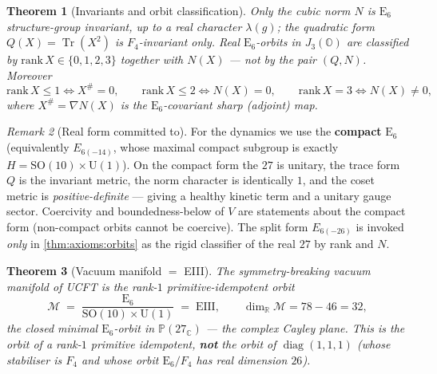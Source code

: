 \documentclass[11pt]{article}
\theoremstyle{plain}
\newtheorem{theorem}{Theorem}[section]
\theoremstyle{definition}
\theoremstyle{remark}
\newtheorem{remark}[theorem]{Remark}
\newcommand{\SO}[1]{\mathrm{SO}(#1)}
\newcommand{\U}[1]{\mathrm{U}(#1)}
\newcommand{\E}[1]{\mathrm{E}_{#1}}
\newcommand{\diag}{\operatorname{diag}}
\newcommand{\Tr}{\operatorname{Tr}}
\newcommand{\M}{\mathcal{M}}
\newcommand{\jalg}{J_3(\mathbb{O})}
\newcommand{\SOTen}{\SO{10}}
\newcommand{\UOne}{\U{1}}
\newcommand{\ESix}{\E{6}}
\begin{document}
\begin{theorem}[Invariants and orbit classification]\label{thm:axioms:orbits}
Only the cubic norm $N$ is $\ESix$ structure-group invariant, up to a real
character $\lambda(g)$; the quadratic form $Q(X)=\Tr(X^2)$ is
$F_4$-invariant only. Real $\ESix$-orbits in $\jalg$ are classified by
$\mathrm{rank}\,X\in\{0,1,2,3\}$ together with $N(X)$ ---
\emph{not} by the pair $(Q,N)$. Moreover
\[
  \mathrm{rank}\,X\le1\iff X^{\#}=0,\qquad
  \mathrm{rank}\,X\le2\iff N(X)=0,\qquad
  \mathrm{rank}\,X=3\iff N(X)\neq0,
\]
where $X^{\#}=\nabla N(X)$ is the $\ESix$-covariant sharp (adjoint) map.
\end{theorem}

\begin{remark}[Real form committed to]\label{rem:axioms:compact}
For the dynamics we use the \textbf{compact} $\ESix$ (equivalently
$E_{6(-14)}$, whose maximal compact subgroup is exactly
$H=\SOTen\times\UOne$). On the compact form the $27$ is unitary, the trace
form $Q$ is the invariant metric, the norm character is identically $1$, and
the coset metric is \emph{positive-definite} --- giving a healthy kinetic
term and a unitary gauge sector. Coercivity and boundedness-below of $V$ are
statements about the compact form (non-compact orbits cannot be coercive).
The split form $E_{6(-26)}$ is invoked \emph{only} in
\autoref{thm:axioms:orbits} as the rigid classifier of the real $27$ by rank
and $N$.
\end{remark}

\begin{theorem}[Vacuum manifold $=$ EIII]\label{thm:axioms:eiii}
The symmetry-breaking vacuum manifold of UCFT is the rank-$1$
primitive-idempotent orbit
\begin{equation}\label{eq:axioms:eiii}
  \M \;=\; \frac{\ESix}{\SOTen\times\UOne} \;=\; \mathrm{EIII},
  \qquad \dim_{\mathbb R}\M = 78-46 = 32,
\end{equation}
the closed minimal $\ESix$-orbit in $\mathbb P(27_{\mathbb C})$ --- the
complex Cayley plane. This is the orbit of a rank-$1$ primitive idempotent,
\textbf{not} the orbit of $\diag(1,1,1)$ (whose stabiliser is $F_4$ and whose
orbit $\ESix/F_4$ has real dimension $26$).
\end{theorem}
\end{document}
